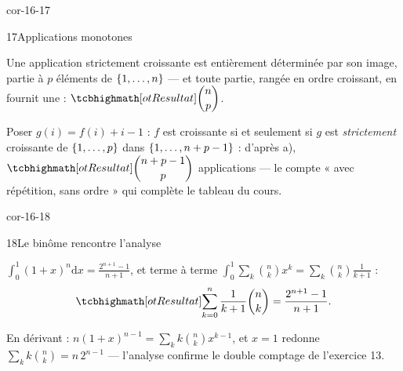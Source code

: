 \begin{blocLivre}{cor-16-17}
\begin{corrige}{17}{Applications monotones}
\begin{questions}
  \item Une application strictement croissante est entièrement déterminée
    par son image, partie à $p$ éléments de $\left\{1,\dots,n\right\}$ — et toute
    partie, rangée en ordre croissant, en fournit une :
    $\res{\dbinom np}$.
  \item Poser $g(i)=f(i)+i-1$ : $f$ est croissante si et seulement si
    $g$ est \emph{strictement} croissante de $\left\{1,\dots,p\right\}$ dans
    $\left\{1,\dots,n+p-1\right\}$ : d'après a),
    $\res{\dbinom{n+p-1}{p}}$ applications — le compte « avec répétition,
    sans ordre » qui complète le tableau du cours.
\end{questions}
\end{corrige}
\end{blocLivre}

\begin{blocLivre}{cor-16-18}
\begin{corrige}{18}{Le binôme rencontre l'analyse}
\begin{questions}
  \item $\displaystyle\int_{0}^{1}(1+x)^{n}\mathrm{d}x
    =\frac{2^{n+1}-1}{n+1}$, et terme à terme
    $\displaystyle\int_{0}^{1}\sum_k\binom nk x^{k}
    =\sum_k\binom nk\frac{1}{k+1}$ :
    \[
    \res{\sum_{k=0}^{n}\frac{1}{k+1}\binom nk=\frac{2^{n+1}-1}{n+1}}.
    \]
  \item En dérivant : $n(1+x)^{n-1}=\sum_k k\binom nk x^{k-1}$, et
    $x=1$ redonne $\sum_k k\binom nk=n\,2^{n-1}$ — l'analyse confirme le
    double comptage de l'exercice 13.
\end{questions}
\end{corrige}
\end{blocLivre}

